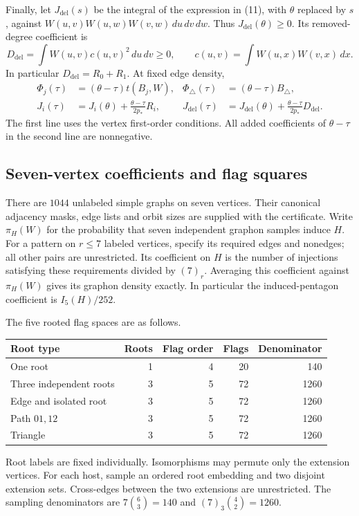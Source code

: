 Finally, let \(J_{\mathrm{del}}(s)\) be the integral of the expression
in (11), with \(\theta\) replaced by \(s\), against
\(W(u,v)W(u,w)W(v,w)\,du\,dv\,dw\).
Thus \(J_{\mathrm{del}}(\theta)\ge0\). Its removed-degree coefficient is
\[
 D_{\mathrm{del}}=\int W(u,v)c(u,v)^2\,du\,dv\ge0,\qquad
 c(u,v)=\int W(u,x)W(v,x)\,dx.
\]
In particular \(D_{\mathrm{del}}=R_0+R_1\). At fixed edge density,
\begin{equation}
 \begin{aligned}
 \Phi_j(\tau)&=(\theta-\tau)t(B_j,W),
 &\Phi_\triangle(\tau)&=(\theta-\tau)B_\triangle,\\
 J_i(\tau)&=J_i(\theta)+\frac{\theta-\tau}{2p_*}R_i,
 &J_{\mathrm{del}}(\tau)&=J_{\mathrm{del}}(\theta)
                  +\frac{\theta-\tau}{2p_*}D_{\mathrm{del}}.
 \end{aligned}\tag{25}
\end{equation}
The first line uses the vertex first-order conditions. All added
coefficients of \(\theta-\tau\) in the second line are nonnegative.

\subsection{Seven-vertex coefficients and flag squares}

There are \(1044\) unlabeled simple graphs on seven vertices. Their
canonical adjacency masks, edge lists and orbit sizes are supplied with
the certificate. Write \(\pi_H(W)\) for the probability that seven
independent graphon samples induce \(H\). For a pattern on \(r\le7\)
labeled vertices, specify its required edges and nonedges; all other
pairs are unrestricted. Its coefficient on \(H\) is the number of
injections satisfying these requirements divided by \((7)_r\).
Averaging this coefficient against \(\pi_H(W)\) gives its graphon density
exactly. In particular the induced-pentagon coefficient is \(I_5(H)/252\).

The five rooted flag spaces are as follows.
\begin{center}
\begin{tabular}{lrrrr}
\toprule
Root type & Roots & Flag order & Flags & Denominator\\
\midrule
One root & 1 & 4 & 20 & 140\\
Three independent roots & 3 & 5 & 72 & 1260\\
Edge and isolated root & 3 & 5 & 72 & 1260\\
Path \(01,12\) & 3 & 5 & 72 & 1260\\
Triangle & 3 & 5 & 72 & 1260\\
\bottomrule
\end{tabular}
\end{center}
Root labels are fixed individually. Isomorphisms may permute only the
extension vertices. For each host, sample an ordered root embedding and
two disjoint extension sets. Cross-edges between the two extensions are
unrestricted. The sampling denominators are
\(7\binom63=140\) and \((7)_3\binom42=1260\).

